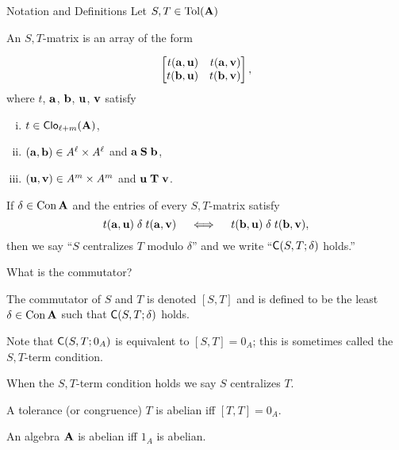 \documentclass[notes=hide,12pt,xcolor=dvipsnames%
   ]{beamer}
\renewcommand{\defn}[1]{\alert{#1}}
\newcommand{\defin}[1]{\alert{#1}}
\newcommand{\medpause}{\pause\medskip}
\begin{document}
\begin{frame}[shrink=10,label=defs]{Notation and Definitions}%
  Let $S, T \in \operatorname{Tol}(\mathbf{A})$

  An \defin{$S,T$-matrix} is an array of the form

  \[
  \begin{bmatrix*}[r] t(\ba,\bu) & t(\ba,\bv)\\ t(\bb,\bu)&t(\bb,\bv)\end{bmatrix*},
  \]
  where $t$, $\mathbf{a}$, $\mathbf{b}$, $\mathbf{u}$, $\mathbf{v}$ satisfy
  \begin{enumerate}[(i)] %
  \item $t\in \operatorname{\mathsf{Clo}}_{\ell + m}(\mathbf{A})$,
  \item $(\mathbf{a}, \mathbf{b})\in A^\ell\times A^\ell$ and $\mathbf{a} \mathrel{\mathbf{S}} \mathbf{b}$,
  \item $(\mathbf{u}, \mathbf{v})\in A^m\times A^m$ and $\mathbf{u} \mathrel{\mathbf{T}} \mathbf{v}$.
  \end{enumerate}
\pause
  If $\delta \in \operatorname{Con} \mathbf{A}$ and the entries of every $S,T$-matrix satisfy
  \begin{equation}
    \label{eq:22}
    t(\mathbf{a},\mathbf{u}) \mathrel{\delta} t(\mathbf{a},\mathbf{v})\quad \iff \quad t(\mathbf{b},\mathbf{u}) \mathrel{\delta} t(\mathbf{b},\mathbf{v}),
  \end{equation}
  then we say ``\defn{$S$ centralizes $T$ modulo $\delta$}'' and we write
  ``$\mathsf{C}(S, T; \delta)$ holds.''
\end{frame}


\begin{frame}[label=defs]{What is the commutator?}

  The \defin{commutator of $S$ and $T$} is denoted $[S, T]$ and is defined to be
  the least $\delta\in \operatorname{Con}\mathbf{A}$ such that $\mathsf{C}(S, T; \delta)$ holds.  

  \medpause
  
  Note that $\mathsf{C}(S, T; 0_A)$ is equivalent to $[S,T] = 0_A$; this
  is sometimes called the \defin{$S, T$-term condition}.

  When the $S, T$-term condition holds we say
  \defn{$S$ centralizes $T$}.

  \medpause
  
  A tolerance (or congruence) $T$ is \defin{abelian} iff $[T, T] = 0_A$.  

  An algebra $\mathbf{A}$ is \defin{abelian} iff $1_A$ is abelian.
\end{frame}

\end{document}
